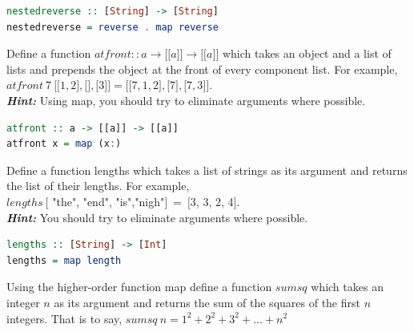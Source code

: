 \documentclass{article}
\begin{document}
\begin{solution}
\begin{lstlisting}[language=Haskell]
nestedreverse :: [String] -> [String]
nestedreverse = reverse . map reverse
\end{lstlisting}
\end{solution}


\begin{exercise} 
Define a function $atfront :: a \rightarrow \lbrack \lbrack  a \rbrack \rbrack \rightarrow  \lbrack \lbrack  a \rbrack \rbrack$  which takes an object and a list of lists and prepends  the object at the front of every component list. For example, \\
$atfront \ 7 \ \lbrack \lbrack 1,2 \rbrack , \lbrack \rbrack , \lbrack 3\rbrack \rbrack = \lbrack \lbrack 7,1,2 \rbrack, \lbrack 7 \rbrack, \lbrack7,3\rbrack \rbrack$. \\
\textbf{\textit{Hint:}} Using map, you should try to eliminate arguments where possible. 
\end{exercise} 


\begin{solution}
\begin{lstlisting}[language=Haskell]
atfront :: a -> [[a]] -> [[a]]
atfront x = map (x:) 
\end{lstlisting}
\end{solution}
\pagebreak

\begin{exercise} 
Define a function lengths which takes a list of strings as its argument and returns the list of their lengths. For example, \\
$lengths \  \lbrack$ "the", "end", "is","nigh"$ \rbrack \ = \ \lbrack $3, 3, 2, 4$\rbrack$. \\
\textbf{\textit{Hint:}} You should try to eliminate arguments where possible. 
\end{exercise} 

\begin{solution}
\begin{lstlisting}[language=Haskell]
lengths :: [String] -> [Int]
lengths = map length
\end{lstlisting}
\end{solution}

\begin{exercise}

Using the higher-order function map define a function $sumsq$ which takes an
integer $n$ as its argument and returns the sum of the squares of the first $n$
integers. That is to say,
$sumsq \ n = 1^{2} + 2^{2} + 3^{2} + \ldots + n^{2}$
\end{exercise} 
\end{document}
